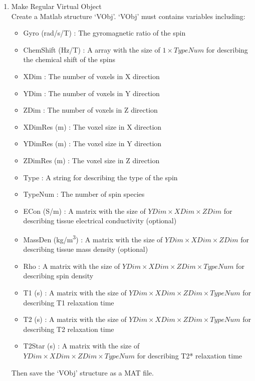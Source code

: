 \documentclass{book}%
\begin{document}
\begin{enumerate}

\item Make Regular Virtual Object \\

Create a Matlab structure `VObj'. `VObj' must contains variables including:

\begin{itemize}
	\item Gyro (rad/s/T) : The gyromagnetic ratio of the spin
	\item ChemShift (Hz/T) : A array with the size of $1 \times TypeNum $ for describing the chemical shift of the spins
	\item XDim : The number of voxels in X direction
	\item YDim : The number of voxels in Y direction
	\item ZDim : The number of voxels in Z direction
	\item XDimRes (m) : The voxel size in X direction
	\item YDimRes (m) : The voxel size in Y direction
	\item ZDimRes (m) : The voxel size in Z direction
	\item Type : A string for describing the type of the spin
	\item TypeNum : The number of spin species
	\item ECon (S/m) : A matrix with the size of $ YDim \times XDim \times ZDim $ for describing tissue electrical conductivity (optional)
	\item MassDen (kg/m\textsuperscript{3}) : A matrix with the size of $ YDim \times XDim \times ZDim $ for describing tissue mass density (optional)
	\item Rho : A matrix with the size of $ YDim \times XDim \times ZDim \times TypeNum $ for describing spin density
	\item T1 (s) : A matrix with the size of $ YDim \times XDim \times ZDim \times TypeNum $ for describing T1 relaxation time
	\item T2 (s) : A matrix with the size of $ YDim \times XDim \times ZDim \times TypeNum $ for describing T2 relaxation time
	\item T2Star (s) : A matrix with the size of $ YDim \times XDim \times ZDim \times TypeNum $ for describing T2* relaxation time
\end{itemize}

Then save the `VObj' structure as a MAT file.


\end{enumerate}
\end{document}
